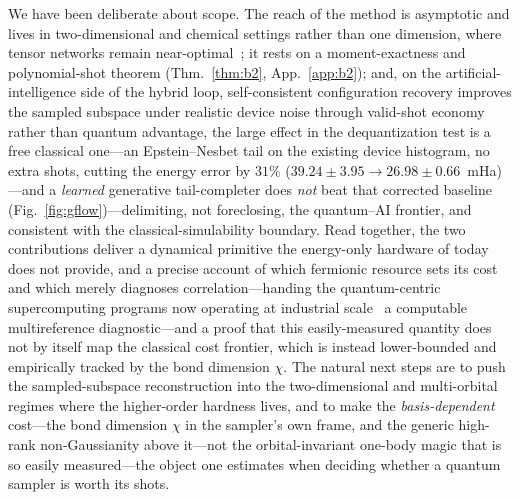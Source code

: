 We have been deliberate about scope. The reach of the method is asymptotic and lives in two-dimensional
and chemical settings rather than one dimension, where tensor networks remain near-optimal~\cite{schollwock2011}; it rests on
a moment-exactness and polynomial-shot theorem (Thm.~\ref{thm:b2}, App.~\ref{app:b2}); and, on the artificial-intelligence side of the hybrid
loop, self-consistent configuration recovery improves the sampled subspace under realistic device
noise through valid-shot economy rather than quantum advantage, the large effect in the dequantization
test is a free classical one---an Epstein--Nesbet tail on the existing device histogram, no extra shots,
cutting the energy error by $31\%$ ($39.24\pm3.95\to26.98\pm0.66$~mHa)---and a \emph{learned} generative
tail-completer does \emph{not} beat that corrected baseline (Fig.~\ref{fig:gflow})---delimiting, not
foreclosing, the quantum--AI frontier, and consistent with the classical-simulability boundary. Read together, the two contributions deliver a dynamical primitive the
energy-only hardware of today does not provide, and a precise account of which fermionic resource sets
its cost and which merely diagnoses correlation---handing the quantum-centric supercomputing programs
now operating at industrial scale~\cite{robledomoreno2025,shirakawa2025} a computable multireference
diagnostic---and a proof that this easily-measured quantity does not by itself map the classical cost
frontier, which is instead lower-bounded and empirically tracked by the bond dimension $\chi$. The natural next steps are to push the sampled-subspace reconstruction into
the two-dimensional and multi-orbital regimes where the higher-order hardness lives, and to make the
\emph{basis-dependent} cost---the bond dimension $\chi$ in the sampler's own frame, and the generic
high-rank non-Gaussianity above it---not the orbital-invariant one-body magic that is so easily
measured---the object one estimates when deciding whether a quantum sampler is worth its shots.
